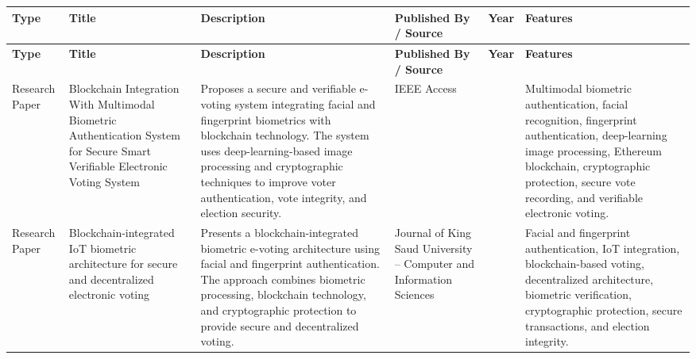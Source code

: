 \documentclass[12pt,a4paper]{report}
\begin{document}
\begin{longtable}{|
		>{\raggedright\arraybackslash}p{1.5cm}|
		>{\raggedright\arraybackslash}p{2.8cm}|
		>{\raggedright\arraybackslash}p{3.3cm}|
		>{\raggedright\arraybackslash}p{2.2cm}|
		>{\centering\arraybackslash}p{0.8cm}|
		>{\raggedright\arraybackslash}p{3.2cm}|
	}
	
	\hline
	
	\textbf{Type} &
	\textbf{Title} &
	\textbf{Description} &
	\textbf{Published By / Source} &
	\textbf{Year} &
	\textbf{Features} \\
	
	\hline
	\endfirsthead
	
	\hline
	
	\textbf{Type} &
	\textbf{Title} &
	\textbf{Description} &
	\textbf{Published By / Source} &
	\textbf{Year} &
	\textbf{Features} \\
	
	\hline
	\endhead
	
	
	Research Paper &
	Blockchain Integration With Multimodal Biometric Authentication System for Secure Smart Verifiable Electronic Voting System &
	Proposes a secure and verifiable e-voting system integrating facial and fingerprint biometrics with blockchain technology. The system uses deep-learning-based image processing and cryptographic techniques to improve voter authentication, vote integrity, and election security. &
	IEEE Access &
	2025 &
	Multimodal biometric authentication, facial recognition, fingerprint authentication, deep-learning image processing, Ethereum blockchain, cryptographic protection, secure vote recording, and verifiable electronic voting. \\
	
	\hline
	
	
	Research Paper &
	Blockchain-integrated IoT biometric architecture for secure and decentralized electronic voting &
	Presents a blockchain-integrated biometric e-voting architecture using facial and fingerprint authentication. The approach combines biometric processing, blockchain technology, and cryptographic protection to provide secure and decentralized voting. &
	Journal of King Saud University -- Computer and Information Sciences &
	2026 &
	Facial and fingerprint authentication, IoT integration, blockchain-based voting, decentralized architecture, biometric verification, cryptographic protection, secure transactions, and election integrity. \\
	

\end{longtable}
\end{document}
